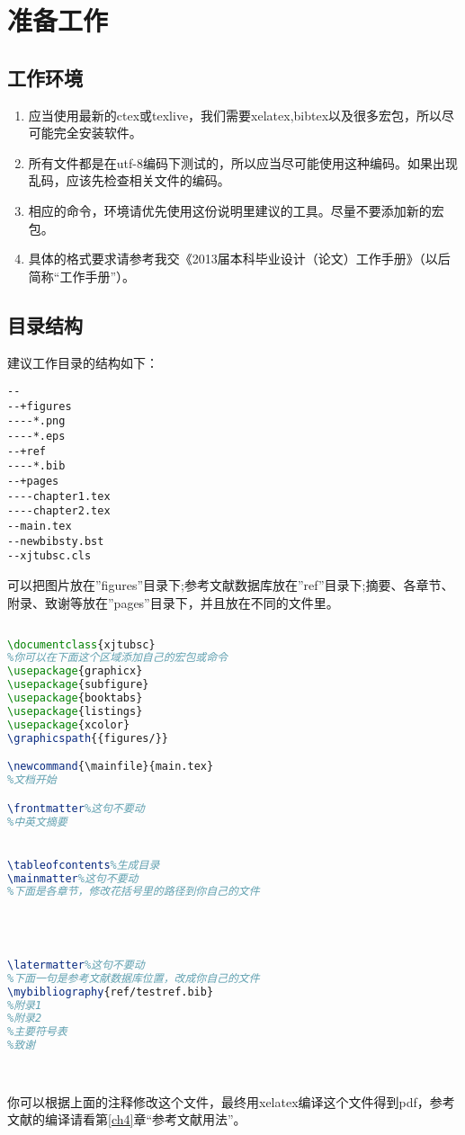 \section{准备工作}
\label{ch1}
\subsection{工作环境}
\label{ch1_1}
\begin{enumerate}[I]
\item 应当使用最新的ctex或texlive，我们需要xelatex,bibtex以及很多宏包，所以尽可能完全安装软件。
\item 所有文件都是在utf-8编码下测试的，所以应当尽可能使用这种编码。如果出现乱码，应该先检查相关文件的编码。
\item 相应的命令，环境请优先使用这份说明里建议的工具。尽量不要添加新的宏包。
\item 具体的格式要求请参考我交《2013届本科毕业设计（论文）工作手册》（以后简称“工作手册”）。
\end{enumerate}

\subsection{目录结构}
\label{ch1_2}
建议工作目录的结构如下：
\begin{lstlisting}[frame=single]
--
--+figures
----*.png
----*.eps
--+ref
----*.bib
--+pages
----chapter1.tex
----chapter2.tex
--main.tex
--newbibsty.bst
--xjtubsc.cls
\end{lstlisting}
可以把图片放在''figures''目录下;参考文献数据库放在''ref''目录下;摘要、各章节、附录、致谢等放在''pages''目录下，并且放在不同的文件里。\par

\subsection{}
\label{ch1_3}
\begin{lstlisting}[frame=single,language=tex]
%========class是xjtubsc========
\documentclass{xjtubsc}
%你可以在下面这个区域添加自己的宏包或命令
\usepackage{graphicx}
\usepackage{subfigure} 
\usepackage{booktabs}
\usepackage{listings}
\usepackage{xcolor}
\graphicspath{{figures/}}

\newcommand{\mainfile}{main.tex}
%文档开始

\frontmatter%这句不要动
%中英文摘要


\tableofcontents%生成目录
\mainmatter%这句不要动
%下面是各章节，修改花括号里的路径到你自己的文件




\latermatter%这句不要动
%下面一句是参考文献数据库位置，改成你自己的文件
\mybibliography{ref/testref.bib}
%附录1
%附录2
%主要符号表
%致谢

 
\end{lstlisting}
你可以根据上面的注释修改这个文件，最终用xelatex编译这个文件得到pdf，参考文献的编译请看第\ref{ch4}章“参考文献用法”。\par